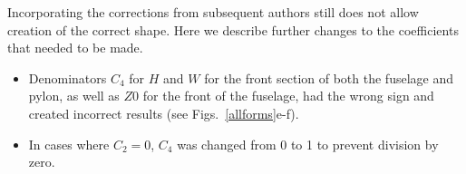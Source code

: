 \documentclass[12pt]{article}
\begin{document}

Incorporating the corrections from subsequent authors still does not allow creation of the correct shape.
Here we describe further changes to the coefficients that needed to be made.
\begin{itemize}
\item Denominators $C_{4}$ for $H$ and $W$ for the front section of both the fuselage and pylon, as well as $Z0$ for the
front of the fuselage, had the wrong sign and created incorrect results (see Figs.~\ref{allforms}e-f).
\item In cases where $C_{2}=0$, $C_{4}$ was changed from 0 to 1 to prevent division by zero.%
\end{itemize}

\end{document}

